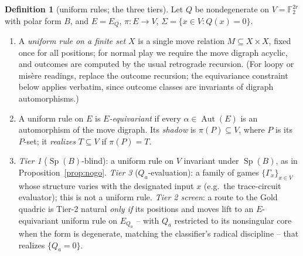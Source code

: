 \documentclass[11pt]{article}
\theoremstyle{plain}
\theoremstyle{definition}
\newtheorem{definition}{Definition}
\newcommand{\F}{\mathbb{F}}
\newcommand{\Sp}{\operatorname{Sp}}
\newcommand{\Aut}{\operatorname{Aut}}
\begin{document}
\begin{definition}[uniform rules; the three tiers]\label{def:tier2}
Let $Q$ be nondegenerate on $V=\F_2^{2r}$ with polar form $B$, and
$E=E_Q$, $\pi\colon E\to V$, $\Sigma=\{x\in V: Q(x)=0\}$.
\begin{enumerate}[label=(\alph*),leftmargin=*]
\item A \emph{uniform rule on a finite set $X$} is a single move relation
$M\subseteq X\times X$, fixed once for all positions; for normal play we
require the move digraph acyclic, and outcomes are computed by the usual
retrograde recursion. (For loopy or misère readings, replace the outcome
recursion; the equivariance constraint below applies verbatim, since
outcome classes are invariants of digraph automorphisms.)
\item A uniform rule on $E$ is \emph{$E$-equivariant} if every
$\alpha\in\Aut(E)$ is an automorphism of the move digraph.
Its \emph{shadow} is $\pi(P)\subseteq V$, where $P$ is its $P$-set; it
\emph{realizes} $T\subseteq V$ if $\pi(P)=T$.
\item \emph{Tier 1} ($\Sp(B)$-blind): a uniform rule on $V$
invariant under $\Sp(B)$, as in
Proposition~\ref{prop:nogo}. \emph{Tier 3} ($Q_a$-evaluation): a family of
games $\{\Gamma_x\}_{x\in V}$ whose structure varies with the designated
input $x$ (e.g.\ the trace-circuit evaluator); this is not a uniform rule.
\emph{Tier 2 screen}: a route to the Gold quadric is Tier-2 natural
\emph{only if} its positions and moves lift to an $E$-equivariant uniform
rule on $E_{Q_a}$ -- with $Q_a$ restricted to its nonsingular core when the
form is degenerate, matching the classifier's radical discipline -- that
realizes $\{Q_a=0\}$.
\end{enumerate}
\end{definition}
\end{document}
